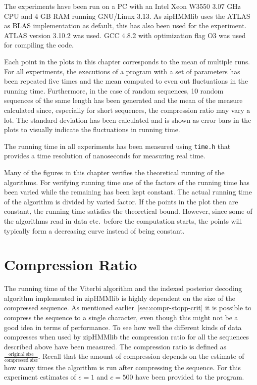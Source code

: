The experiments have been run on a PC with an Intel Xeon W3550 $3.07$ GHz CPU
and 4 GB RAM running GNU/Linux 3.13. As zipHMMlib uses the ATLAS as BLAS
implementation as default, this has also been used for the experiment. ATLAS
version 3.10.2 was used. GCC 4.8.2 with optimization flag O3 was used for
compiling the code.

Each point in the plots in this chapter corresponds to the mean of multiple
runs. For all experiments, the executions of a program with a set of parameters
has been repeated five times and the mean computed to even out fluctuations in
the running time. Furthermore, in the case of random sequences, 10 random
sequences of the same length has been generated and the mean of the measure
calculated since, especially for short sequences, the compression ratio may
vary a lot. The standard deviation has been calculated and is shown as error
bars in the plots to visually indicate the fluctuations in running time.

The running time in all experiments has been measured using \texttt{time.h}
that provides a time resolution of nanoseconds for measuring real time.

Many of the figures in this chapter verifies the theoretical running of the
algorithms. For verifying running time one of the factors of the running time
has been varied while the remaining has been kept constant. The actual running
time of the algorithm is divided by varied factor. If the points in the plot
then are constant, the running time satisfies the theoretical bound. However,
since some of the algorithms read in data etc.\ before the
computation starts, the points will typically form a decreasing curve instead
of being constant.

\section{Compression Ratio}
\label{sec:compression-ratio}

The running time of the Viterbi algorithm and the indexed posterior decoding
algorithm implemented in zipHMMlib is highly dependent on the size of the
compressed sequence. As mentioned earlier~\ref{sec:compr-stopp-crit} it is
possible to compress the sequence to a single character, even though this might
not be a good idea in terms of performance. To see how well the different kinds
of data compresses when used by zipHMMlib the compression ratio for all the
sequences described above have been measured. The compression ratio is defined
as $\frac{\text{original size}}{\text{compressed size}}$. Recall that the
amount of compression depends on the estimate of how many times the algorithm
is run after compressing the sequence. For this experiment estimates of
$e = 1$ and $e = 500$ have been provided to the program.

